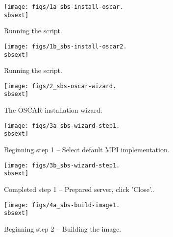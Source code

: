 \begin{figure}[htbp]
  \begin{center}
    \texttt{[image: figs/1a\_sbs-install-oscar.\\sbsext]}
    \caption{Running the  script.}
    \label{fig:sbs-install-oscar}
  \end{center}
\end{figure}

\begin{figure}[htbp]
  \begin{center}
    \texttt{[image: figs/1b\_sbs-install-oscar2.\\sbsext]}
    \caption{Running the  script.}
    \label{fig:sbs-install-oscar2}
  \end{center}
\end{figure}

\begin{figure}[htbp]
  \begin{center}
    \texttt{[image: figs/2\_sbs-oscar-wizard.\\sbsext]}
    \caption{The OSCAR installation wizard.}
    \label{fig:sbs-install-wizard}
  \end{center}
\end{figure}

\begin{figure}[htbp]
  \begin{center}
    \texttt{[image: figs/3a\_sbs-wizard-step1.\\sbsext]}
    \caption{Beginning step 1 -- Select default MPI implementation.}
    \label{fig:sbs-install-wizard-s1}
  \end{center}
\end{figure}

\begin{figure}[htbp]
  \begin{center}
    \texttt{[image: figs/3b\_sbs-wizard-step1.\\sbsext]}
    \caption{Completed step 1 -- Prepared server, click 'Close'..}
    \label{fig:sbs-install-wizard-s1b}
  \end{center}
\end{figure}

\begin{figure}[htbp]
  \begin{center}
    \texttt{[image: figs/4a\_sbs-build-image1.\\sbsext]}
    \caption{Beginning step 2 -- Building the image.}
    \label{fig:sbs-build-image}
  \end{center}
\end{figure}

